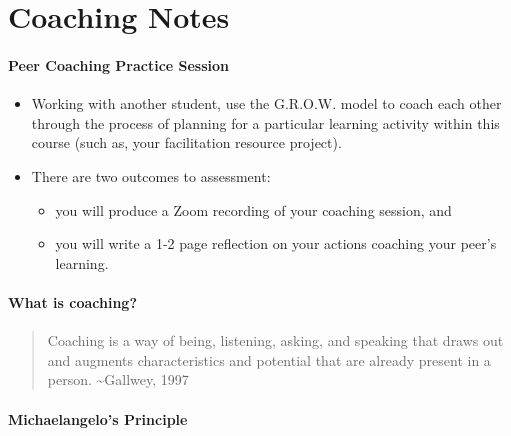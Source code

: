 \documentclass[
]{book}
\providecommand{\tightlist}{%
  \setlength{\itemsep}{0pt}\setlength{\parskip}{0pt}}
\begin{document}
\hypertarget{coaching-notes}{%
\chapter*{Coaching Notes}\label{coaching-notes}}

\hypertarget{peer-coaching-practice-session}{%
\subsubsection*{Peer Coaching Practice Session}\label{peer-coaching-practice-session}}

\begin{itemize}
\tightlist
\item
  Working with another student, use the G.R.O.W. model to coach each other through the process of planning for a particular learning activity within this course (such as, your facilitation resource project).
\item
  There are two outcomes to assessment:

  \begin{itemize}
  \tightlist
  \item
    you will produce a Zoom recording of your coaching session, and
  \item
    you will write a 1-2 page reflection on your actions coaching your peer's learning.
  \end{itemize}
\end{itemize}

\hypertarget{what-is-coaching}{%
\subsubsection*{\texorpdfstring{What is \textbf{coaching}?}{What is coaching?}}\label{what-is-coaching}}

\begin{quote}
Coaching is a way of being, listening, asking, and speaking that draws out and augments characteristics and potential that are already present in a person. \textasciitilde Gallwey, 1997
\end{quote}

\hypertarget{michaelangelos-principle}{%
\subsubsection*{Michaelangelo's Principle}\label{michaelangelos-principle}}
\end{document}
